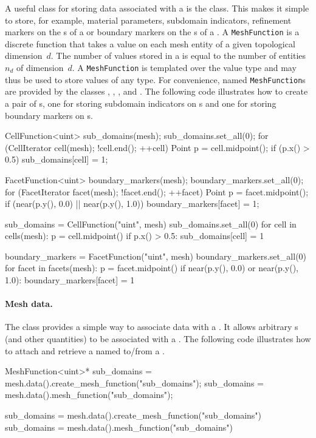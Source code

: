 A useful class for storing data associated with a  is the
 class. This makes it simple to store, for example,
material parameters, subdomain indicators, refinement markers on the
s of a  or boundary markers on the s of
a .  A \texttt{MeshFunction} is a discrete function that takes
a value on each mesh entity of a given topological dimension~$d$. The
number of values stored in a  is equal to the number
of entities $n_d$ of dimension~$d$. A \texttt{MeshFunction} is templated
over the value type and may thus be used to store values of any
type. For convenience, named \texttt{MeshFunction}s are provided by the
classes , , ,
 and .  The following code
illustrates how to create a pair of s, one for storing
subdomain indicators on s and one for storing boundary markers
on s.
\begin{c++}
CellFunction<uint> sub_domains(mesh);
sub_domains.set_all(0);
for (CellIterator cell(mesh); !cell.end(); ++cell)
{
  Point p = cell.midpoint();
  if (p.x() > 0.5)
    sub_domains[cell] = 1;
}

FacetFunction<uint> boundary_markers(mesh);
boundary_markers.set_all(0);
for (FacetIterator facet(mesh); !facet.end(); ++facet)
{
  Point p = facet.midpoint();
  if (near(p.y(), 0.0) || near(p.y(), 1.0))
    boundary_markers[facet] = 1;
}
\end{c++}
\begin{python}
sub_domains = CellFunction("uint", mesh)
sub_domains.set_all(0)
for cell in cells(mesh):
    p = cell.midpoint()
    if p.x() > 0.5:
        sub_domains[cell] = 1

boundary_markers = FacetFunction("uint", mesh)
boundary_markers.set_all(0)
for facet in facets(mesh):
    p = facet.midpoint()
    if near(p.y(), 0.0) or near(p.y(), 1.0):
        boundary_markers[facet] = 1
\end{python}


\paragraph{Mesh data.}

The  class provides a simple way to associate data with
a . It allows arbitrary s (and other
quantities) to be associated with a . The following code
illustrates how to attach and retrieve a  named
 to/from a .
\begin{c++}
MeshFunction<uint>* sub_domains = mesh.data().create_mesh_function("sub_domains");
sub_domains = mesh.data().mesh_function("sub_domains");
\end{c++}
\begin{python}
sub_domains = mesh.data().create_mesh_function("sub_domains")
sub_domains = mesh.data().mesh_function("sub_domains")
\end{python}

